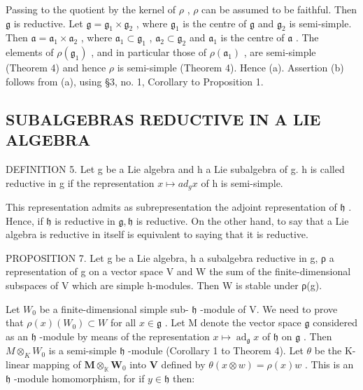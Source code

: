 Passing to the quotient by the kernel of \(\rho\) , \(\rho\) can be assumed to be faithful. Then \(\mathfrak{g}\) is reductive. Let \(\mathfrak{g} = \mathfrak{g}_1 \times \mathfrak{g}_2\) , where \(\mathfrak{g}_1\) is the centre of \(\mathfrak{g}\) and \(\mathfrak{g}_2\) is semi-simple. Then \(\mathfrak{a} = \mathfrak{a}_1 \times \mathfrak{a}_2\) , where \(\mathfrak{a}_1 \subset \mathfrak{g}_1\) , \(\mathfrak{a}_2 \subset \mathfrak{g}_2\) and \(\mathfrak{a}_1\) is the centre of \(\mathfrak{a}\) . The elements of \(\rho(\mathfrak{g}_1)\) , and in particular those of \(\rho(\mathfrak{a}_1)\) , are semi-simple (Theorem 4) and hence \(\rho\) is semi-simple (Theorem 4). Hence (a). Assertion (b) follows from (a), using §3, no. 1, Corollary to Proposition 1.

\subsection{SUBALGEBRAS REDUCTIVE IN A LIE ALGEBRA}

DEFINITION 5. Let g be a Lie algebra and h a Lie subalgebra of g. h is called reductive in g if the representation \(x \mapsto ad_{g} x\) of h is semi-simple.

This representation admits as subrepresentation the adjoint representation of \(\mathfrak{h}\) . Hence, if \(\mathfrak{h}\) is reductive in \(\mathfrak{g},\mathfrak{h}\) is reductive. On the other hand, to say that a Lie algebra is reductive in itself is equivalent to saying that it is reductive.

PROPOSITION 7. Let g be a Lie algebra, h a subalgebra reductive in g, ρ a representation of g on a vector space V and W the sum of the finite-dimensional subspaces of V which are simple h-modules. Then W is stable under ρ(g).

Let \(W_0\) be a finite-dimensional simple sub- \(\mathfrak{h}\) -module of V. We need to prove that \(\rho(x)(W_0) \subset W\) for all \(x \in \mathfrak{g}\) . Let M denote the vector space \(\mathfrak{g}\) considered as an \(\mathfrak{h}\) -module by means of the representation \(x \mapsto \operatorname{ad}_{\mathfrak{g}} x\) of \(\mathfrak{h}\) on \(\mathfrak{g}\) . Then \(M \otimes_{K} W_0\) is a semi-simple \(\mathfrak{h}\) -module (Corollary 1 to Theorem 4). Let \(\theta\) be the K-linear mapping of \(\mathbf{M} \otimes_{\mathbb{K}} \mathbf{W}_0\) into \(\mathbf{V}\) defined by \(\theta(x \otimes w) = \rho(x)w\) . This is an \(\mathfrak{h}\) -module homomorphism, for if \(y \in \mathfrak{h}\) then:

